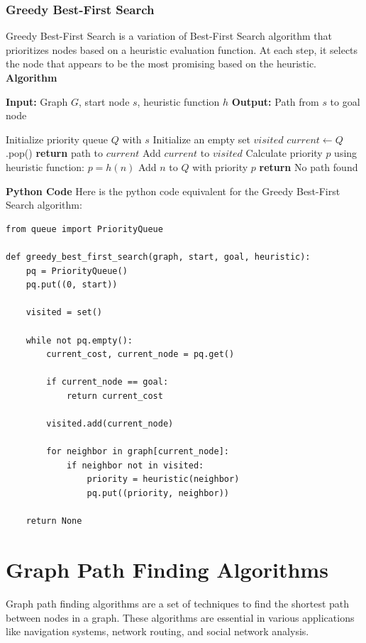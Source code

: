 \documentclass[12pt]{book} %
\begin{document}
\subsubsection{Greedy Best-First Search}
Greedy Best-First Search is a variation of Best-First Search algorithm that prioritizes nodes based on a heuristic evaluation function. At each step, it selects the node that appears to be the most promising based on the heuristic.
\FloatBarrier
\textbf{Algorithm}
\FloatBarrier
\begin{algorithm}
\caption{Greedy Best-First Search}
\begin{algorithmic}
\State \textbf{Input:} Graph $G$, start node $s$, heuristic function $h$
\State \textbf{Output:} Path from $s$ to goal node

\State Initialize priority queue $Q$ with $s$
\State Initialize an empty set $visited$
    \State $current \gets Q$.pop()
        \State \textbf{return} path to $current$
    \EndIf
    \State Add $current$ to $visited$
            \State Calculate priority $p$ using heuristic function: $p = h(n)$
            \State Add $n$ to $Q$ with priority $p$
        \EndIf
    \EndFor
\EndWhile
\State \textbf{return} No path found
\end{algorithmic}
\end{algorithm}
\FloatBarrier
\textbf{Python Code}
\FloatBarrier
Here is the python code equivalent for the Greedy Best-First Search algorithm:
\FloatBarrier
\begin{lstlisting}
from queue import PriorityQueue

def greedy_best_first_search(graph, start, goal, heuristic):
    pq = PriorityQueue()
    pq.put((0, start))

    visited = set()

    while not pq.empty():
        current_cost, current_node = pq.get()

        if current_node == goal:
            return current_cost

        visited.add(current_node)

        for neighbor in graph[current_node]:
            if neighbor not in visited:
                priority = heuristic(neighbor)
                pq.put((priority, neighbor))

    return None
\end{lstlisting}
\FloatBarrier

\section{Graph Path Finding Algorithms}
Graph path finding algorithms are a set of techniques to find the shortest path between nodes in a graph. These algorithms are essential in various applications like navigation systems, network routing, and social network analysis.
\end{document}
